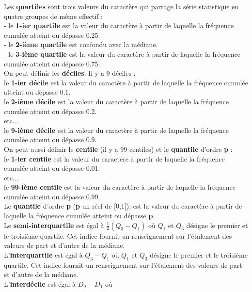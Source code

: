 \documentclass[a4paper,11pt]{book}
\begin{document}
Les {\bf quartiles} sont trois valeurs du caract\`ere qui partage la s\'erie 
statistique en quatre groupes de m\^eme effectif :\\
- le {\bf 1-ier quartile} est la valeur du caract\`ere \`a partir de laquelle 
la fr\'equence cumul\'ee atteint ou d\'epasse 0.25.\\
- le {\bf 2-i\`eme quartile} est confondu avec la m\'ediane.\\ 
- le {\bf 3-i\`eme quartile} est la valeur du caract\`ere \`a partir de 
laquelle la fr\'equence cumul\'ee atteint ou d\'epasse 0.75.\\
On peut d\'efinir les {\bf d\'eciles}. Il y a 9 d\'eciles :\\
le {\bf 1-ier d\'ecile} est la valeur du caract\`ere \`a partir de laquelle la 
fr\'equence cumul\'ee atteint ou d\'epasse 0.1.\\
le {\bf 2-i\`eme d\'ecile} est la valeur du caract\`ere \`a partir de laquelle 
la fr\'equence cumul\'ee atteint ou d\'epasse 0.2.\\
etc...\\
le {\bf 9-i\`eme d\'ecile} est la valeur du caract\`ere \`a partir de laquelle 
la fr\'equence cumul\'ee atteint ou d\'epasse 0.9.\\
On peut aussi d\'efinir le {\bf centile} (il y a 99 centiles) et le 
{\bf  quantile}  d'ordre {\bf p} :\\
le {\bf 1-ier centile} est la valeur du caract\`ere \`a partir de laquelle la 
fr\'equence cumul\'ee atteint ou d\'epasse 0.01.\\
etc...\\
le {\bf 99-i\`eme centile} est la valeur du caract\`ere \`a partir de laquelle 
la fr\'equence cumul\'ee atteint ou d\'epasse 0.99.\\
Le {\bf quantile} d'ordre {\bf p} ({\bf p} un r\'eel de [0,1[), est la valeur 
du caract\`ere \`a partir de laquelle la fr\'equence cumul\'ee atteint ou 
d\'epasse {\bf p}.\\
Le {\bf semi-interquartile}  est \'egal \`a $\frac{1}{2}(Q_3-Q_1)$ o\`u 
$Q_1$ et $Q_3$ d\'esigne le premier et le troisi\`eme quartile. Cet indice 
fournit un renseignement sur l'\'etalement des valeurs de part et d'autre de la
m\'ediane.\\
L'{\bf interquartile}  est \'egal \`a $Q_3-Q_1$ o\`u 
$Q_1$ et $Q_3$ d\'esigne le premier et le troisi\`eme quartile. Cet indice 
fournit un renseignement sur l'\'etalement des valeurs de part et d'autre de la
m\'ediane.\\
L'{\bf interd\'ecile}  est \'egal \`a $D_9-D_1$ o\`u 
\end{document}
